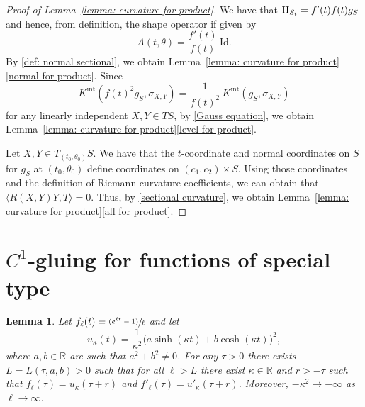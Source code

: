 \documentclass[JEP,XML,SOM,Unicode,NoFloatCountersInSection]{cedram}
\newcommand{\psfrac}[2]{\sfrac{(#1)}{#2}}
\newcommand{\Int}{\mathrm{int}}
\newtheorem{lemma}[theorem]{Lemma}
\theoremstyle{definition}
\newcommand{\RomanNumeralCaps}[1]
{\MakeUppercase{\romannumeral #1}}
\newcommand{\II}{\textup{\RomanNumeralCaps{2}}}
\renewcommand{\>}{{\rangle}}
\newcommand{\<}{{\langle}}
\begin{document}
\begin{proof}[Proof of Lemma~\ref{lemma: curvature for product}]
We have that $\II_{S_t} = f'(t)f(t)g_S$ and hence, from definition, the shape operator if given by\vspace*{-3pt}
\[
A(t,\theta) = \frac{f'(t)}{f(t)}\,\text{Id}.
\]
By \eqref{def: normal sectional}, we obtain Lemma~\ref{lemma: curvature for product}\eqref{normal for product}. Since\vspace*{-3pt}
\[
K^{\Int}(f(t)^2g_S,\sigma_{X,Y}) = \frac{1}{f(t)^2}\,K^{\Int}(g_S,\sigma_{X,Y})
\]
for any linearly independent $X,Y\in TS$, by \eqref{Gauss equation}, we obtain Lemma~\ref{lemma: curvature for product}\eqref{level for product}.

Let $X,Y\in T_{(t_0,\theta_0)}S$. We have that the $t$-coordinate and normal coordinates on $S$ for $g_S$ at $(t_0,\theta_0)$ define coordinates on $(c_1,c_2)\times S$. Using those coordinates and the definition of Riemann curvature coefficients, we can obtain that $\langle R(X,Y)Y,T\rangle=0$. Thus, by \eqref{sectional curvature}, we obtain Lemma~\ref{lemma: curvature for product}\eqref{all for product}.
\end{proof}

\section{\texorpdfstring{$C^1$}{C}-gluing for functions of special type}\label{app: combine f with construction 2}

\begin{lemma}\label{lemma: combine f with constant 2}
Let $f_\ell(t) = \psfrac{e^{\ell t}-1}{\ell}$ and let\vspace*{-3pt}
\[
u_\kappa(t)=\frac{1}{\kappa^2}\bigl(a\sinh(\kappa t)+b\cosh(\kappa t)\bigr)^2,
\]
where $a,b\in\mathbb R$ are such that $a^2+b^2\neq 0$. For any $\tau>0$ there exists $L=L(\tau,a,b)>0$ such that for all $\ell>L$ there exist $\kappa\in\mathbb R$ and $r>-\tau$ such that $f_\ell(\tau)=u_\kappa(\tau+r)$ and $f'_\ell(\tau) = u'_\kappa(\tau+r)$. Moreover, $-\kappa^2\to-\infty$ as $\ell\to\infty$.
\end{lemma}
\end{document}
